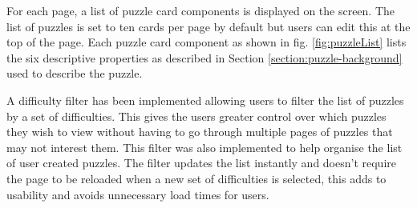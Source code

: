\documentclass{l4proj}
\begin{document}
For each page, a list of puzzle card components is displayed on the screen. The list of puzzles is set to ten cards per page by default but users can edit this at the top of the page. Each puzzle card component as shown in fig. \ref{fig:puzzleList} lists the six descriptive properties as described in Section \ref{section:puzzle-background} used to describe the puzzle.  

A difficulty filter has been implemented allowing users to filter the list of puzzles by a set of difficulties. This gives the users greater control over which puzzles they wish to view without having to go through multiple pages of puzzles that may not interest them. This filter was also implemented to help organise the list of user created puzzles. The filter updates the list instantly and doesn't require the page to be reloaded when a new set of difficulties is selected, this adds to usability and avoids unnecessary load times for users.


\end{document}
